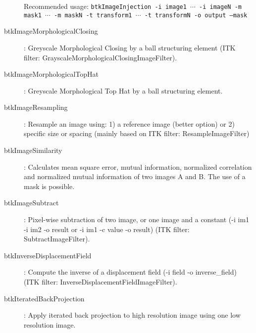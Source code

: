 \begin{description}
Recommended usage: \texttt{btkImageInjection -i image1 $\cdots$ -i
imageN -m mask1 $\cdots$ -m maskN -t transform1 $\cdots$ -t
transformN -o output --mask}

\item[btkImageMorphologicalClosing]: Greyscale Morphological Closing by a ball structuring element (ITK filter: GrayscaleMorphologicalClosingImageFilter).
\item[btkImageMorphologicalTopHat]: Greyscale Morphological Top Hat by a ball structuring element.
\item[btkImageResampling]: Resample an image using: 1) a reference image (better option) or 2) specific size or spacing (mainly based on ITK filter: ResampleImageFilter)
\item[btkImageSimilarity]: Calculates mean square error, mutual information, normalized correlation and normalized mutual information of two images A and B. The use of a mask is possible.
\item[btkImageSubtract]: Pixel-wise subtraction of two image, or one image and a constant (-i im1 -i im2 -o result or -i im1 -c value -o result) (ITK filter: SubtractImageFilter).
\item[btkInverseDisplacementField]: Compute the inverse of a displacement field (-i field -o inverse\_field) (ITK filter: InverseDisplacementFieldImageFilter).
\item[btkIteratedBackProjection]: Apply iterated back projection to high resolution image using one low resolution image.

\end{description}
